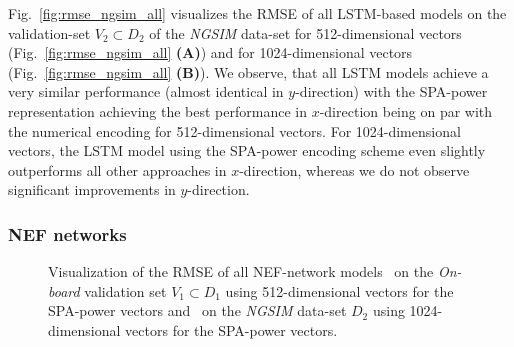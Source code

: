 Fig.~\ref{fig:rmse_ngsim_all} visualizes the \ac{RMSE} of all \ac{LSTM}-based models on the validation-set $V_2 \subset D_2$ of the \emph{\ac{NGSIM}} data-set for \num{512}-dimensional vectors (Fig.~\ref{fig:rmse_ngsim_all} \textbf{(A)}) and for \num{1024}-dimensional vectors (Fig.~\ref{fig:rmse_ngsim_all} \textbf{(B)}).
We observe, that all \ac{LSTM} models achieve a very similar performance (almost identical in $y$-direction) with the \ac{SPA}-power representation achieving the best performance in $x$-direction being on par with the numerical encoding for \num{512}-dimensional vectors.
For \num{1024}-dimensional vectors, the \ac{LSTM} model using the \ac{SPA}-power encoding scheme even slightly outperforms all other approaches in $x$-direction, whereas we do not observe significant improvements in $y$-direction.

\subsubsection{\ac{NEF} networks}
\begin{figure}[t!]
	\centering
    \vspace{-0.3cm}
    \caption{Visualization of the \ac{RMSE} of all \ac{NEF}-network models~\protect{} on the \emph{On-board} validation set $V_1 \subset D_1$ using \num{512}-dimensional vectors for the \ac{SPA}-power vectors and~\protect{} on the \emph{\ac{NGSIM}} data-set $D_2$ using \num{1024}-dimensional vectors for the \ac{SPA}-power vectors.}\label{fig:rmse_nef_nets}

\end{figure}

